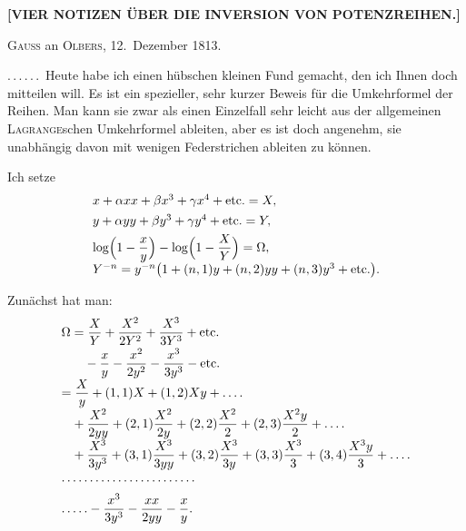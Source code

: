 \clearpage
{}
\begin{center}
\textbf{[VIER NOTIZEN ÜBER DIE INVERSION VON POTENZREIHEN.]}
\end{center}



\begin{center}
\textsc{Gauss} an \textsc{Olbers}, 12.\ Dezember 1813.
\end{center}

\noindent\hspace*{\parindent}.\,.\,.\,.\,.\,.\ Heute habe ich einen hübschen kleinen Fund gemacht, den ich Ihnen doch mitteilen
will. Es ist ein spezieller, sehr kurzer Beweis für die Umkehrformel der Reihen. Man kann sie zwar
als einen Einzelfall sehr leicht aus der allgemeinen \textsc{Lagrange}schen Umkehrformel
ableiten, aber es ist doch angenehm, sie unabhängig davon mit wenigen Federstrichen ableiten zu
können.

\noindent\hspace*{\parindent}Ich setze
\[
\begin{array}{l}
x+\alpha xx+\beta x^3+\gamma x^4+\text{etc.}=X,\\[4pt]
y+\alpha yy+\beta y^3+\gamma y^4+\text{etc.}=Y,\\[4pt]
\log\Bigl(1-\dfrac{x}{y}\Bigr)-\log\Bigl(1-\dfrac{X}{Y}\Bigr)=\Omega,\\[4pt]
Y^{-n}=y^{-n}\bigl(1+(n,1)y+(n,2)yy+(n,3)y^3+\text{etc.}\bigr).
\end{array}
\]

\noindent Zunächst hat man:
\[
\begin{array}{l}
\Omega=\dfrac{X}{Y}+\dfrac{X^2}{2Y^2}+\dfrac{X^3}{3Y^3}+\text{etc.}\\[6pt]
\hphantom{\Omega=}-\dfrac{x}{y}-\dfrac{x^2}{2y^2}-\dfrac{x^3}{3y^3}-\text{etc.}\\[6pt]
=\dfrac{X}{y}+(1,1)X+(1,2)Xy+.\,.\,.\,.\\[6pt]
\hphantom{=}+\dfrac{X^2}{2yy}+(2,1)\dfrac{X^2}{2y}+(2,2)\dfrac{X^2}{2}+(2,3)\dfrac{X^2y}{2}+.\,.\,.\,.\\[6pt]
\hphantom{=}+\dfrac{X^3}{3y^3}+(3,1)\dfrac{X^3}{3yy}+(3,2)\dfrac{X^3}{3y}+(3,3)\dfrac{X^3}{3}+(3,4)\dfrac{X^3y}{3}+.\,.\,.\,.\\[6pt]
.\,.\,.\,.\,.\,.\,.\,.\,.\,.\,.\,.\,.\,.\,.\,.\,.\,.\,.\,.\,.\,.\,.\,.\\[6pt]
.\,.\,.\,.\,.-\dfrac{x^3}{3y^3}-\dfrac{xx}{2yy}-\dfrac{x}{y}.
\end{array}
\]

